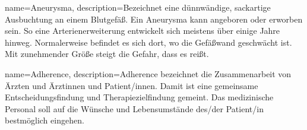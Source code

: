  {
	name={Aneurysma},
	description={Bezeichnet eine dünnwändige, sackartige Ausbuchtung an einem Blutgefäß. Ein Aneurysma kann angeboren oder erworben sein. So eine Arterienerweiterung entwickelt sich meistens über einige Jahre hinweg. Normalerweise befindet es sich dort, wo die Gefäßwand  geschwächt ist. Mit zunehmender Größe steigt die Gefahr, dass es reißt. \cite{haring:2014:insult}} 
}

 {
	name={Adherence},
	description={Adherence bezeichnet die Zusammenarbeit von Ärzten und Ärztinnen und Patient/innen. Damit ist eine gemeinsame Entscheidungsfindung und Therapiezielfindung gemeint. Das medizinische Personal soll auf die Wünsche und Lebensumstände des/der Patient/in bestmöglich eingehen. \cite{world:2003:adherence}}
}

